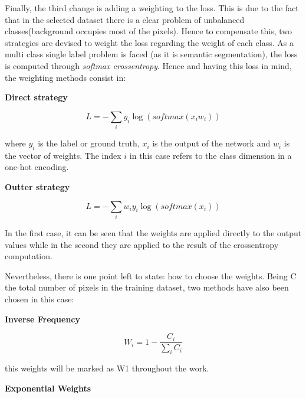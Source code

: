Finally, the third change is adding a weighting to the loss. This is due to the fact that in the selected dataset there is a clear problem of unbalanced classes(background occupies most of the pixels). Hence to compensate this, two strategies are devised to weight the loss regarding the weight of each class. As a multi class single label problem is faced (as it is semantic segmentation), the loss is computed through \textit{softmax crossentropy}. Hence and having this loss in mind, the weighting methods consist in:\newline

\textbf{Direct strategy}\newline

\begin{equation*}
L = -\sum_{i} y_{i}\log(softmax(x_{i}w_{i}))
\end{equation*}

where $y_{i}$ is the label or ground truth, $x_{i}$ is the output of the network and $w_{i}$ is the vector of weights. The index $i$ in this case refers to the class dimension in a one-hot encoding.\newline

\textbf{Outter strategy}\newline

\begin{equation*}
L = -\sum_{i}  w_{i}y_{i}\log(softmax(x_{i}))
\end{equation*}


In the first case, it can be seen that the weights are applied directly to the output values while in the second they are applied to the result of the crossentropy computation.\newline

Nevertheless, there  is one point left to state: how to choose the weights. Being C the total number of pixels in the training dataset, two methods have also been chosen in this case:\newline

\textbf{Inverse Frequency}\newline

\begin{equation*}
W_{i} = 1-\frac{C_{i}}{\sum_{i}C_{i}}
\end{equation*}

this weights will be marked as W1 throughout the work.\newline

\textbf{Exponential Weights}\newline

